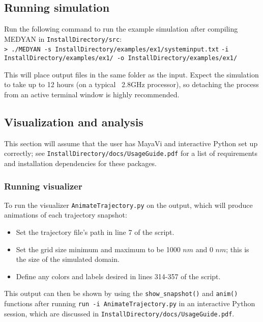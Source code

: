 \documentclass[11pt, oneside]{article}   	%
\begin{document}
\subsection{Running simulation}

Run the following command to run the example simulation after compiling MEDYAN in \texttt{InstallDirectory/src}:\\

\indent \texttt{> ./MEDYAN -s InstallDirectory/examples/ex1/systeminput.txt}\newline
\indent\indent \texttt{-i InstallDirectory/examples/ex1/  -o InstallDirectory/examples/ex1/}\newline

\noindent This will place output files in the same folder as the input. Expect the simulation to take up to 12 hours (on a typical ~2.8GHz processor), so detaching the process from an active terminal window is highly recommended.

\subsection{Visualization and analysis}

This section will assume that the user has MayaVi and interactive Python set up correctly; see \texttt{InstallDirectory/docs/UsageGuide.pdf} for a list of requirements and installation dependencies for these packages. 

\subsubsection{Running visualizer}

To run the visualizer \texttt{AnimateTrajectory.py} on the output, which will produce animations of each trajectory snapshot:

\begin{itemize}
\item Set the trajectory file's path in line 7 of the script.
\item Set the grid size minimum and maximum to be 1000 $nm$ and 0 $nm$; this is the size of the simulated domain.
\item Define any colors and labels desired in lines 314-357 of the script.
\end{itemize}

This output can then be shown by using the \texttt{show\_snapshot()} and \texttt{anim()} functions after running \texttt{run -i AnimateTrajectory.py} in an interactive Python session, which are discussed in \texttt{InstallDirectory/docs/UsageGuide.pdf}.
\end{document}
